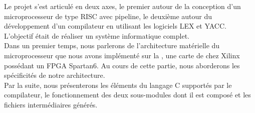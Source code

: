 Le projet s'est articulé en deux axes, le premier autour de la conception d'un microprocesseur de type RISC avec pipeline, le deuxième autour du développement d'un compilateur en utilisant les logiciels LEX et YACC. L'objectif était de réaliser un système informatique complet.\\
Dans un premier temps, nous parlerons de l'architecture matérielle du microprocesseur que nous avons implémenté sur la \nexys{}, une carte de chez Xilinx possédant un FPGA Spartan6. Au cours de cette partie, nous aborderons les spécificités de notre architecture.\\
Par la suite, nous présenterons les éléments du langage C supportés par le compilateur, le fonctionnement des deux sous-modules dont il est composé et les fichiers intermédiaires générés.


